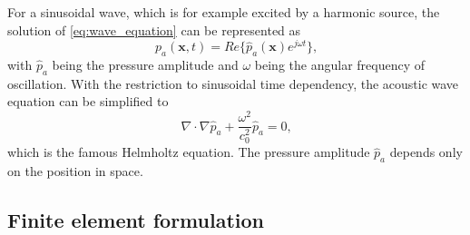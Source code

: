 For a sinusoidal wave, which is for example excited by a harmonic source, the solution of \cref{eq:wave_equation} can be represented as
\begin{equation}
	p_a(\boldsymbol{x},t) = Re\lbrace\hat{p}_a(\boldsymbol{x})e^{j\omega t}\rbrace \text{,} \label{eq:sinusoidal_wave}
\end{equation}
with $\hat{p}_a$ being the pressure amplitude and $\omega$ being the angular frequency of oscillation. With the restriction to sinusoidal time dependency, the acoustic wave equation can be simplified to
\begin{equation}
	\nabla\cdot\nabla\hat{p}_a + \frac{\omega^2}{c_0^2}\hat{p}_a = 0 \text{,} \label{eq:helmholtz_equation}
\end{equation}
which is the famous Helmholtz equation. The pressure amplitude $\hat{p}_a$ depends only on the position in space.

\subsection*{Finite element formulation}

